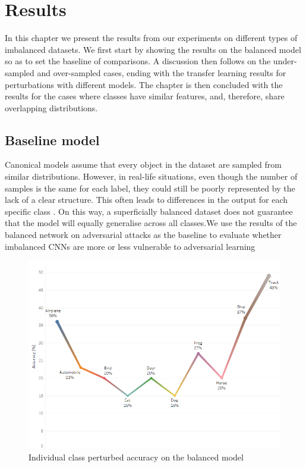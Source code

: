 

\chapter{Results}
In this chapter we present the results from our experiments on different types of imbalanced datasets. We first start by showing the results on the balanced model so as to set the baseline of comparisons. A discussion then follows on the under-sampled and over-sampled cases, ending with the transfer learning results for perturbations with different models. The chapter is then concluded with the results for the cases where classes have similar features, and, therefore, share overlapping distributions.


\section{Baseline model}

Canonical models assume that every object in the dataset are sampled from similar distributions. However, in real-life situations, even though the number of samples is the same for each label, they could still be poorly represented by the lack of a clear structure. This often leads to differences in the output for each specific class \cite{krawczyk2016learning}. On this way, a superficially balanced dataset does not guarantee that the model will equally generalise across all classes.We use the results of the balanced network on adversarial attacks as the baseline
to evaluate whether imbalanced CNNs are more or less vulnerable to adversarial
learning
\begin{figure}[H]
	\centering
	\includegraphics[scale=0.7]{balanced_perturbed.png}
	\caption{Individual class perturbed accuracy on the balanced model}
	\label{fig:balanced_perturbed}
\end{figure}

